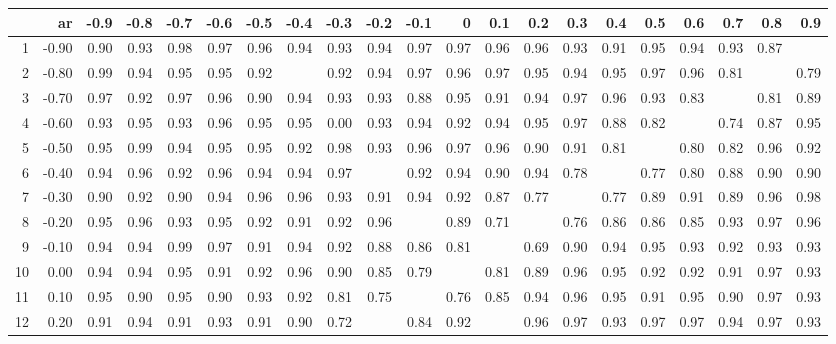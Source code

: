 \begin{table}[ht]
\centering
\begin{tabular}{rrrrrrrrrrrrrrrrrrrrr}
  \hline
 & ar & -0.9 & -0.8 & -0.7 & -0.6 & -0.5 & -0.4 & -0.3 & -0.2 & -0.1 & 0 & 0.1 & 0.2 & 0.3 & 0.4 & 0.5 & 0.6 & 0.7 & 0.8 & 0.9 \\ 
  \hline
1 & -0.90 & 0.90 & 0.93 & 0.98 & 0.97 & 0.96 & 0.94 & 0.93 & 0.94 & 0.97 & 0.97 & 0.96 & 0.96 & 0.93 & 0.91 & 0.95 & 0.94 & 0.93 & 0.87 &  \\ 
  2 & -0.80 & 0.99 & 0.94 & 0.95 & 0.95 & 0.92 &  & 0.92 & 0.94 & 0.97 & 0.96 & 0.97 & 0.95 & 0.94 & 0.95 & 0.97 & 0.96 & 0.81 &  & 0.79 \\ 
  3 & -0.70 & 0.97 & 0.92 & 0.97 & 0.96 & 0.90 & 0.94 & 0.93 & 0.93 & 0.88 & 0.95 & 0.91 & 0.94 & 0.97 & 0.96 & 0.93 & 0.83 &  & 0.81 & 0.89 \\ 
  4 & -0.60 & 0.93 & 0.95 & 0.93 & 0.96 & 0.95 & 0.95 & 0.00 & 0.93 & 0.94 & 0.92 & 0.94 & 0.95 & 0.97 & 0.88 & 0.82 &  & 0.74 & 0.87 & 0.95 \\ 
  5 & -0.50 & 0.95 & 0.99 & 0.94 & 0.95 & 0.95 & 0.92 & 0.98 & 0.93 & 0.96 & 0.97 & 0.96 & 0.90 & 0.91 & 0.81 &  & 0.80 & 0.82 & 0.96 & 0.92 \\ 
  6 & -0.40 & 0.94 & 0.96 & 0.92 & 0.96 & 0.94 & 0.94 & 0.97 &  & 0.92 & 0.94 & 0.90 & 0.94 & 0.78 &  & 0.77 & 0.80 & 0.88 & 0.90 & 0.90 \\ 
  7 & -0.30 & 0.90 & 0.92 & 0.90 & 0.94 & 0.96 & 0.96 & 0.93 & 0.91 & 0.94 & 0.92 & 0.87 & 0.77 &  & 0.77 & 0.89 & 0.91 & 0.89 & 0.96 & 0.98 \\ 
  8 & -0.20 & 0.95 & 0.96 & 0.93 & 0.95 & 0.92 & 0.91 & 0.92 & 0.96 &  & 0.89 & 0.71 &  & 0.76 & 0.86 & 0.86 & 0.85 & 0.93 & 0.97 & 0.96 \\ 
  9 & -0.10 & 0.94 & 0.94 & 0.99 & 0.97 & 0.91 & 0.94 & 0.92 & 0.88 & 0.86 & 0.81 &  & 0.69 & 0.90 & 0.94 & 0.95 & 0.93 & 0.92 & 0.93 & 0.93 \\ 
  10 & 0.00 & 0.94 & 0.94 & 0.95 & 0.91 & 0.92 & 0.96 & 0.90 & 0.85 & 0.79 &  & 0.81 & 0.89 & 0.96 & 0.95 & 0.92 & 0.92 & 0.91 & 0.97 & 0.93 \\ 
  11 & 0.10 & 0.95 & 0.90 & 0.95 & 0.90 & 0.93 & 0.92 & 0.81 & 0.75 &  & 0.76 & 0.85 & 0.94 & 0.96 & 0.95 & 0.91 & 0.95 & 0.90 & 0.97 & 0.93 \\ 
  12 & 0.20 & 0.91 & 0.94 & 0.91 & 0.93 & 0.91 & 0.90 & 0.72 &  & 0.84 & 0.92 &  & 0.96 & 0.97 & 0.93 & 0.97 & 0.97 & 0.94 & 0.97 & 0.93 \\ 

\end{tabular}
\end{table}
